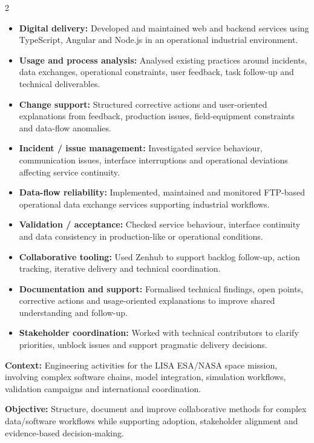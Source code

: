 \documentclass[8pt,a4paper,ragged2e,withhyper]{altacv}
\begin{document}
\begin{paracol}{2}
\begin{itemize}
  \item \textbf{Digital delivery:} Developed and maintained web and backend services using TypeScript, Angular and Node.js in an operational industrial environment.
  \item \textbf{Usage and process analysis:} Analysed existing practices around incidents, data exchanges, operational constraints, user feedback, task follow-up and technical deliverables.
  \item \textbf{Change support:} Structured corrective actions and user-oriented explanations from feedback, production issues, field-equipment constraints and data-flow anomalies.
  \item \textbf{Incident / issue management:} Investigated service behaviour, communication issues, interface interruptions and operational deviations affecting service continuity.
  \item \textbf{Data-flow reliability:} Implemented, maintained and monitored FTP-based operational data exchange services supporting industrial workflows.
  \item \textbf{Validation / acceptance:} Checked service behaviour, interface continuity and data consistency in production-like or operational conditions.
  \item \textbf{Collaborative tooling:} Used Zenhub to support backlog follow-up, action tracking, iterative delivery and technical coordination.
  \item \textbf{Documentation and support:} Formalised technical findings, open points, corrective actions and usage-oriented explanations to improve shared understanding and follow-up.
  \item \textbf{Stakeholder coordination:} Worked with technical contributors to clarify priorities, unblock issues and support pragmatic delivery decisions.
\end{itemize}

\divider


\textbf{Context:} Engineering activities for the LISA ESA/NASA space mission, involving complex software chains, model integration, simulation workflows, validation campaigns and international coordination.

\textbf{Objective:} Structure, document and improve collaborative methods for complex data/software workflows while supporting adoption, stakeholder alignment and evidence-based decision-making.


\end{paracol}
\end{document}
